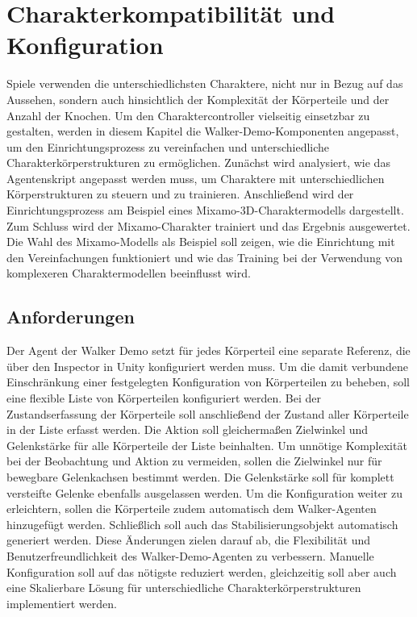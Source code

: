 \section{Charakterkompatibilität und Konfiguration}
Spiele verwenden die unterschiedlichsten Charaktere, nicht nur in Bezug auf das Aussehen, sondern auch hinsichtlich der Komplexität der Körperteile und der Anzahl der Knochen. Um den Charaktercontroller vielseitig einsetzbar zu gestalten, werden in diesem Kapitel die Walker-Demo-Komponenten angepasst, um den Einrichtungsprozess zu vereinfachen und unterschiedliche Charakterkörperstrukturen zu ermöglichen. Zunächst wird analysiert, wie das Agentenskript angepasst werden muss, um Charaktere mit unterschiedlichen Körperstrukturen zu steuern und zu trainieren. Anschließend wird der Einrichtungsprozess am Beispiel eines Mixamo-3D-Charaktermodells dargestellt. Zum Schluss wird der Mixamo-Charakter trainiert und das Ergebnis ausgewertet. Die Wahl des Mixamo-Modells als Beispiel soll zeigen, wie die Einrichtung mit den Vereinfachungen funktioniert und wie das Training bei der Verwendung von komplexeren Charaktermodellen beeinflusst wird.

\subsection{Anforderungen}	
Der Agent der Walker Demo setzt für jedes Körperteil eine separate Referenz, die über den Inspector in Unity konfiguriert werden muss. Um die damit verbundene Einschränkung einer festgelegten Konfiguration von Körperteilen zu beheben, soll eine flexible Liste von Körperteilen konfiguriert werden. Bei der Zustandserfassung der Körperteile soll anschließend der Zustand aller Körperteile in der Liste erfasst werden. Die Aktion soll gleichermaßen Zielwinkel und Gelenkstärke für alle Körperteile der Liste beinhalten. Um unnötige Komplexität bei der Beobachtung und Aktion zu vermeiden, sollen die Zielwinkel nur für bewegbare Gelenkachsen bestimmt werden. Die Gelenkstärke soll für komplett versteifte Gelenke ebenfalls ausgelassen werden. Um die Konfiguration weiter zu erleichtern, sollen die Körperteile zudem automatisch dem Walker-Agenten hinzugefügt werden. Schließlich soll auch das Stabilisierungsobjekt automatisch generiert werden. Diese Änderungen zielen darauf ab, die Flexibilität und Benutzerfreundlichkeit des Walker-Demo-Agenten zu verbessern. Manuelle Konfiguration soll auf das nötigste reduziert werden, gleichzeitig soll aber auch eine Skalierbare Lösung für unterschiedliche Charakterkörperstrukturen implementiert werden.

